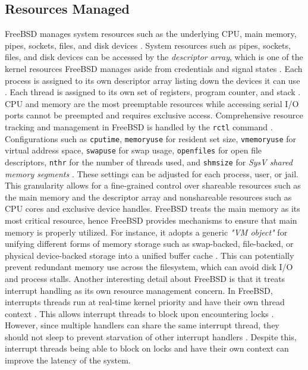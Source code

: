 \subsection{Resources Managed} \label{resources-managed} %

FreeBSD manages system resources such as the underlying CPU, main memory, pipes, sockets, files, and disk devices
\parencite{mckusick2014_process}. System resources such as pipes, sockets, files, and disk devices can be accessed by the
\textit{descriptor array}, which is one of the kernel resources FreeBSD manages aside from credentials and signal states
\parencite{mckusick2014_process}. Each process is assigned to its own descriptor array listing down the devices it can
use \parencite{mckusick2014_process}. Each thread is assigned to its own set of registers, program counter, and stack \parencite{mckusick2014_process}.
CPU and memory are the most preemptable resources while accessing serial I/O ports cannot be preempted and requires
exclusive access. Comprehensive resource tracking and management in FreeBSD is handled by the \texttt{rctl} command
\parencite{wojtczak2022}. Configurations such as \texttt{cputime}, \texttt{memoryuse} for resident set size,
\texttt{vmemoryuse} for virtual address space, \texttt{swapuse} for swap usage, \texttt{openfiles} for open file
descriptors, \texttt{nthr} for the number of threads used, and \texttt{shmsize} for \textit{SysV shared memory segments}
\parencite{wojtczak2022}. These settings can be adjusted for each process, user, or jail. This granularity allows
for a fine-grained control over shareable resources such as the main memory and the descriptor array and nonshareable
resources such as CPU cores and exclusive device handles. FreeBSD treats the main memory as its most critical resource,
hence FreeBSD provides mechanisms to ensure that main memory is properly utilized. For instance, it adopts
a generic \textit{"VM object"} for unifying different forms of memory storage such as swap-backed, file-backed, or physical
device-backed storage into a unified buffer cache \parencite{freebsd_vms}. This can potentially prevent redundant
memory use across the filesystem, which can avoid disk I/O and process stalls. Another interesting detail about FreeBSD
is that it treats interrupt handling as its own resource management concern. In FreeBSD, interrupts threads run at
real-time kernel priority and have their own thread context \parencite{freebsd_genarchi}. This allows interrupt threads
to block upon encountering locks \parencite{freebsd_genarchi}. However, since multiple handlers can share the same interrupt
thread, they should not sleep to prevent starvation of other interrupt handlers \parencite{freebsd_genarchi}. Despite this,
interrupt threads being able to block on locks and have their own context can improve the latency of the system.

